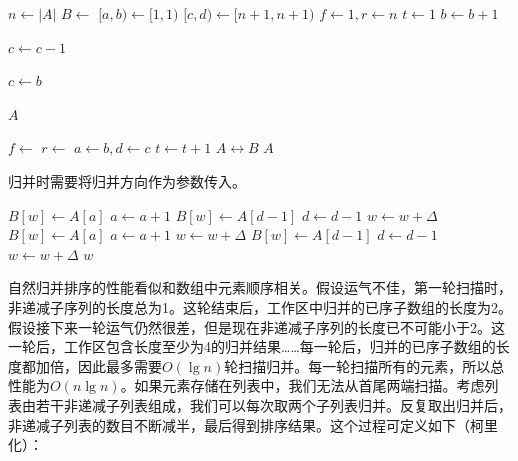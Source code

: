 \documentclass[b5paper]{ctexart}
\begin{document}
\begin{algorithmic}[1]
    \State $n \gets |A|$
    \State $B \gets$   
    \Loop
      \State $[a, b) \gets [1, 1)$
      \State $[c, d) \gets [n+1, n+1)$
      \State $f \gets 1, r \gets n$ 
      \State $t \gets 1$            
                     
        \Repeat \Comment{扩展$[a, b)$}
          \State $b \gets b + 1$

        \Repeat \Comment{扩展$[c, d)$}
          \State $c \gets c - 1$

         
          \State $c \gets b$
        \EndIf

         \Comment{$[a, b)$覆盖全数组时排序结束}
          \State \Return $A$
        \EndIf

         
          \State $f \gets$ \Call{Merge}{$A, [a, b), [c, d), B, f, 1$}
        \Else {}
          \State $r \gets$ \Call{Merge}{$A, [a, b), [c, d), B, r, -1$}
        \EndIf
        \State $a \gets b, d \gets c$
        \State $t \gets t + 1$
      \EndWhile
      \State {} $A \leftrightarrow B$ 
    \EndLoop
  \EndIf
  \State \Return $A$
\EndFunction
\end{algorithmic}

归并时需要将归并方向作为参数传入。

\begin{algorithmic}[1]
\Function{Merge}{$A, [a, b), [c, d), B, w, \Delta$}
      \State $B[w] \gets A[a]$
      \State $a \gets a + 1$
    \Else
      \State $B[w] \gets A[d-1]$
      \State $d \gets d - 1$
    \EndIf
    \State $w \gets w + \Delta$
  \EndWhile
    \State $B[w] \gets A[a]$
    \State $a \gets a + 1$
    \State $w \gets w + \Delta$
  \EndWhile
    \State $B[w] \gets A[d-1]$
    \State $d \gets d - 1$
    \State $w \gets w + \Delta$
  \EndWhile
  \State \Return $w$
\EndFunction
\end{algorithmic}

自然归并排序的性能看似和数组中元素顺序相关。假设运气不佳，第一轮扫描时，非递减子序列的长度总为1。这轮结束后，工作区中归并的已序子数组的长度为2。假设接下来一轮运气仍然很差，但是现在非递减子序列的长度已不可能小于2。这一轮后，工作区包含长度至少为4的归并结果……每一轮后，归并的已序子数组的长度都加倍，因此最多需要$O(\lg n)$轮扫描归并。每一轮扫描所有的元素，所以总性能为$O(n \lg n)$。如果元素存储在列表中，我们无法从首尾两端扫描。考虑列表由若干非递减子列表组成，我们可以每次取两个子列表归并。反复取出归并后，非递减子列表的数目不断减半，最后得到排序结果。这个过程可定义如下（柯里化）：
\end{document}
